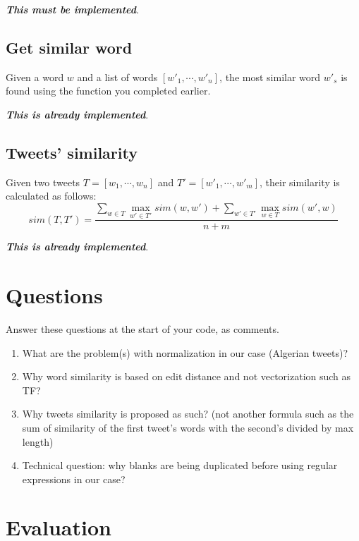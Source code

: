 \documentclass[11pt, a4paper]{article}
\begin{document}
\textbf{\slshape This must be implemented}.

\subsection{Get similar word}

Given a word $ w $ and a list of words $ [w'_1, \cdots, w'_n] $, the most similar word $ w'_s $ is found using the function you completed earlier.

\textbf{\slshape This is already implemented}.

\subsection{Tweets' similarity}

Given two tweets $ T = [w_1, \cdots, w_n]$ and $ T' = [w'_1, \cdots, w'_m] $, their similarity is calculated as follows:
\[sim(T, T') = \frac{\sum_{w \in T} \max_{w' \in T'} sim(w, w') + \sum_{w' \in T'} \max_{w \in T} sim(w', w)}{n + m}\]

\textbf{\slshape This is already implemented}.


\section{Questions}

Answer these questions at the start of your code, as comments.
\begin{enumerate}
	\item What are the problem(s) with normalization in our case (Algerian tweets)?
	
	\item Why word similarity is based on edit distance and not vectorization such as TF?
	
	\item Why tweets similarity is proposed as such? (not another formula such as the sum of similarity of the first tweet's words with the second's divided by max length)
	
	\item Technical question: why blanks are being duplicated before using regular expressions in our case?
	
\end{enumerate}


\section{Evaluation}
\end{document}
